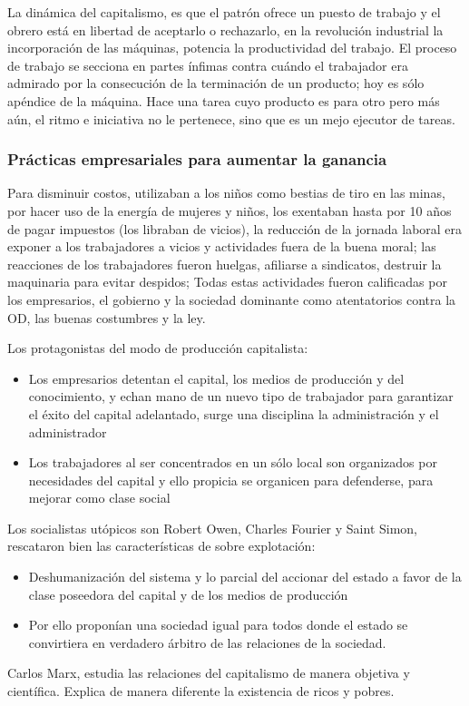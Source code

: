 
La dinámica del capitalismo, es que el patrón ofrece un puesto de trabajo y el obrero está en libertad de aceptarlo o rechazarlo, en la revolución industrial la incorporación de las máquinas, potencia la productividad del trabajo. El proceso de trabajo se secciona en partes ínfimas contra cuándo el trabajador era admirado por la consecución de la terminación de un producto; hoy es sólo apéndice de la máquina. Hace una tarea cuyo producto es para otro pero más aún, el ritmo e iniciativa no le pertenece, sino que es un mejo ejecutor de tareas.
\subsubsection{Prácticas empresariales para aumentar la ganancia}
Para disminuir costos, utilizaban a los niños como bestias de tiro en las minas, por hacer uso de la energía de mujeres y niños, los exentaban hasta por 10 años de pagar impuestos (los libraban de vicios), la reducción de la jornada laboral era exponer a los trabajadores a vicios y actividades fuera de la buena moral; las reacciones de los trabajadores fueron huelgas, afiliarse a sindicatos, destruir la maquinaria para evitar despidos; Todas estas actividades fueron calificadas por los empresarios, el gobierno y la sociedad dominante como atentatorios contra la OD, las buenas costumbres y la ley.

Los protagonistas del modo de producción capitalista:
\begin{itemize}
    \item Los empresarios detentan el capital, los medios de producción y del conocimiento, y echan mano de un nuevo tipo de trabajador para garantizar el éxito del capital adelantado, surge una disciplina la administración y el administrador
    \item Los trabajadores al ser concentrados en un sólo local son organizados por necesidades del capital y ello propicia se organicen para defenderse, para mejorar como clase social
\end{itemize}
Los socialistas utópicos son Robert Owen, Charles Fourier y Saint Simon, rescataron bien las características de sobre explotación:
\begin{itemize}
    \item Deshumanización del sistema y lo parcial del accionar del estado a favor de la clase poseedora del capital y de los medios de producción
    \item Por ello proponían una sociedad igual para todos donde el estado se convirtiera en verdadero árbitro de las relaciones de la sociedad.
\end{itemize}
Carlos Marx, estudia las relaciones del capitalismo de manera objetiva y científica. Explica de manera diferente la existencia de ricos y pobres.

